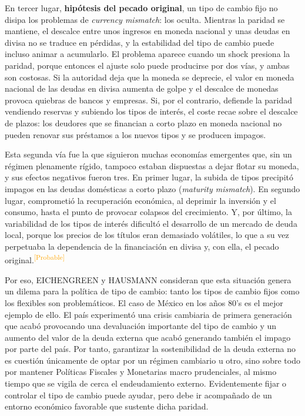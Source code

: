 \documentclass[10pt,a4paper]{article}
\begin{document}
En tercer lugar, \textbf{hipótesis del pecado original}, un tipo de cambio fijo no disipa los problemas de \textit{currency mismatch}: los oculta. Mientras la paridad se mantiene, el descalce entre unos ingresos en moneda nacional y unas deudas en divisa no se traduce en pérdidas, y la estabilidad del tipo de cambio puede incluso animar a acumularlo. El problema aparece cuando un shock presiona la paridad, porque entonces el ajuste solo puede producirse por dos vías, y ambas son costosas. Si la autoridad deja que la moneda se deprecie, el valor en moneda nacional de las deudas en divisa aumenta de golpe y el descalce de monedas provoca quiebras de bancos y empresas. Si, por el contrario, defiende la paridad vendiendo reservas y subiendo los tipos de interés, el coste recae sobre el descalce de plazos: los deudores que se financian a corto plazo en moneda nacional no pueden renovar sus préstamos a los nuevos tipos y se producen impagos.

Esta segunda vía fue la que siguieron muchas economías emergentes que, sin un régimen plenamente rígido, tampoco estaban dispuestas a dejar flotar su moneda, y sus efectos negativos fueron tres. En primer lugar, la subida de tipos precipitó impagos en las deudas domésticas a corto plazo (\textit{maturity mismatch}). En segundo lugar, comprometió la recuperación económica, al deprimir la inversión y el consumo, hasta el punto de provocar colapsos del crecimiento. Y, por último, la variabilidad de los tipos de interés dificultó el desarrollo de un mercado de deuda local, porque los precios de los títulos eran demasiado volátiles, lo que a su vez perpetuaba la dependencia de la financiación en divisa y, con ella, el pecado original.\textcolor{orange}{\textsuperscript{[Probable]}}

Por eso, EICHENGREEN y HAUSMANN consideran que esta situación genera un dilema para la política de tipo de cambio: tanto los tipos de cambio fijos como los flexibles son problemáticos. El caso de México en los años 80's es el mejor ejemplo de ello. El país experimentó una crisis cambiaria de primera generación que acabó provocando una devaluación importante del tipo de cambio y un aumento del valor de la deuda externa que acabó generando también el impago por parte del país. Por tanto, garantizar la sostenibilidad de la deuda externa no es cuestión únicamente de optar por un régimen cambiario u otro, sino sobre todo por mantener Políticas Fiscales y Monetarias macro prudenciales, al mismo tiempo que se vigila de cerca el endeudamiento externo. Evidentemente fijar o controlar el tipo de cambio puede ayudar, pero debe ir acompañado de un entorno económico favorable que sustente dicha paridad. 
\end{document}
